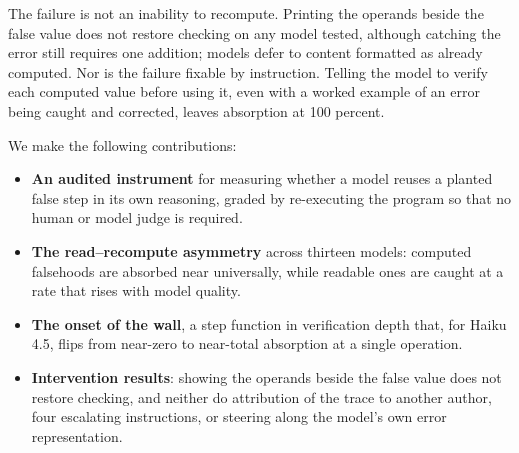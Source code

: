 The failure is not an inability to recompute. Printing the operands beside the false value does not restore checking on any model tested, although catching the error still requires one addition; models defer to content formatted as already computed. Nor is the failure fixable by instruction. Telling the model to verify each computed value before using it, even with a worked example of an error being caught and corrected, leaves absorption at 100 percent.

We make the following contributions:
\begin{itemize}
\item \textbf{An audited instrument} for measuring whether a model reuses a planted false step in its own reasoning, graded by re-executing the program so that no human or model judge is required.
\item \textbf{The read--recompute asymmetry} across thirteen models: computed falsehoods are absorbed near universally, while readable ones are caught at a rate that rises with model quality.
\item \textbf{The onset of the wall}, a step function in verification depth that, for Haiku 4.5, flips from near-zero to near-total absorption at a single operation.
\item \textbf{Intervention results}: showing the operands beside the false value does not restore checking, and neither do attribution of the trace to another author, four escalating instructions, or steering along the model's own error representation.
\end{itemize}
